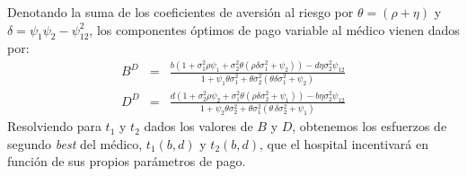﻿\documentclass[12pt,letterpaper]{article}
\begin{document}
Denotando la suma de los coeficientes de aversión al riesgo por $\theta=(\rho + \eta)$ y $\delta={\psi_1\psi_2-\psi_{12}^2}$, los componentes óptimos de pago variable al médico vienen dados por:
\begin{eqnarray*}
B^D&=&\frac{b(1+\sigma_1^2\rho\psi_1+\sigma_2^2\theta(\rho\delta\sigma_1^2+\psi_2))-d\eta\sigma_2^2\psi_{12}}{1+\psi_1\theta\sigma_1^2+\theta\sigma_2^2\left(\theta\delta\sigma_1^2+\psi_2\right)}\\
D^D&=&\frac{d(1+\sigma_2^2\rho\psi_2+\sigma_1^2\theta(\rho\delta\sigma_2^2+\psi_1))-b\eta\sigma_2^2\psi_{12}}{1+\psi_2\theta\sigma_2^2+\theta\sigma_1^2\left( \theta\,\delta\sigma_2^2+\psi_1\right)}
\end{eqnarray*}
Resolviendo para $t_1$ y $t_2$ dados los valores de $B$ y $D$, obtenemos los esfuerzos de segundo \emph{best} del médico, $t_1(b,d)$ y $t_2(b,d)$, que el hospital incentivará en función de sus propios parámetros de pago.
\end{document}
